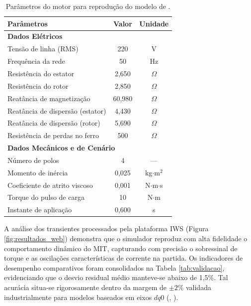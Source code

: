 \documentclass[a4paper]{ifacconf}
\begin{document}
\begin{table}[htbp]
\centering
\caption{Parâmetros do motor para reprodução do modelo de \cite{usta2024mathematical}.}
\label{tab:params_usta}
\begin{tabular}{lcc}
\hline
\textbf{Parâmetros} & \textbf{Valor} & \textbf{Unidade} \\ \hline
\multicolumn{3}{l}{\textbf{Dados Elétricos}} \\
Tensão de linha (RMS)        & 220     & V          \\
Frequência da rede           & 50      & Hz         \\
Resistência do estator       & 2,650   & $\Omega$   \\
Resistência do rotor         & 2,850   & $\Omega$   \\
Reatância de magnetização    & 60,980  & $\Omega$   \\
Reatância de dispersão (estator) & 4,430   & $\Omega$   \\
Reatância de dispersão (rotor)   & 5,690   & $\Omega$   \\
Resistência de perdas no ferro   & 500     & $\Omega$   \\ \hline
\multicolumn{3}{l}{\textbf{Dados Mecânicos e de Cenário}} \\
Número de polos              & 4       & ---        \\
Momento de inércia           & 0,025   & kg$\cdot$m$^2$ \\
Coeficiente de atrito viscoso & 0,001   & N$\cdot$m$\cdot$s \\
Torque do pulso de carga     & 10      & N$\cdot$m  \\
Instante de aplicação        & 0,600   & s          \\ \hline
\end{tabular}
\end{table}

A análise dos transientes processados pela plataforma IWS (Figura \ref{fig:resultados_web}) demonstra que o simulador reproduz com alta fidelidade o comportamento dinâmico do MIT, capturando com precisão o sobressinal de torque e as oscilações características de corrente na partida. Os indicadores de desempenho comparativos foram consolidados na Tabela \ref{tab:validacao}, evidenciando que o desvio residual médio manteve-se abaixo de 1,5\%. Tal acurácia situa-se rigorosamente dentro da margem de $\pm 2\%$ validada industrialmente para modelos baseados em eixos $dq0$ (\citeauthor{leroux2022static}, \citeyear{leroux2022static}).
\end{document}
